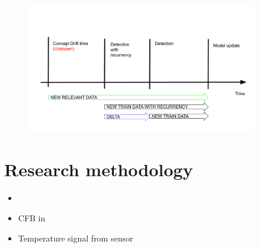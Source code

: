 \begin{figure}[htb!]
	\centering
	\includegraphics[width=0.9\textwidth]{images/google_slides/scheme_cd_recurrency}
  \caption{
	}\label{fig:research_question}
\end{figure}


\section{Research methodology}


\begin{itemize}
  \item 
  \item CFB in~\cite{x}
  \item Temperature signal from sensor
\end{itemize}

